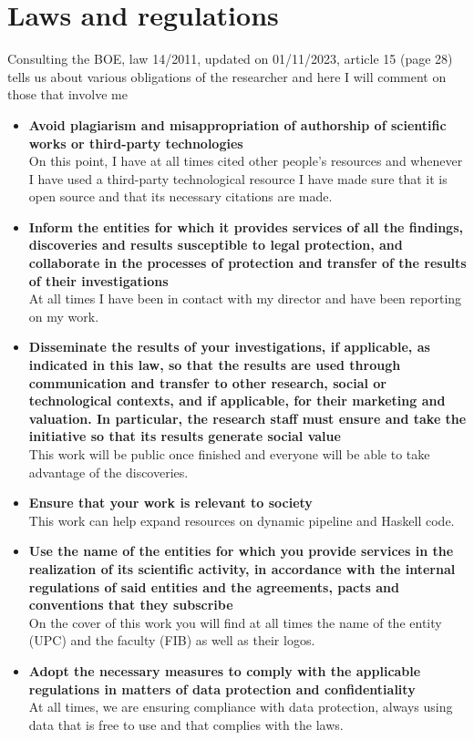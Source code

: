 \chapter{Laws and regulations}
Consulting the BOE, law 14/2011, updated on 01/11/2023, article 15 (page 28) tells us about various obligations of the researcher and here I will comment on those that involve me \cite{}
\begin{itemize}
    \item \textbf{Avoid plagiarism and misappropriation of authorship of scientific works or third-party technologies} \\
    On this point, I have at all times cited other people's resources and whenever I have used a third-party technological resource I have made sure that it is open source and that its necessary citations are made.
    \item \textbf{Inform the entities for which it provides services of all the findings, discoveries and results susceptible to legal protection, and collaborate in the processes of protection and transfer of the results of their investigations} \\
    At all times I have been in contact with my director and have been reporting on my work.
    \item \textbf{Disseminate the results of your investigations, if applicable, as indicated in this law, so that the results are used through communication and transfer to other research, social or technological contexts, and if applicable, for their marketing and valuation. In particular, the research staff must ensure and take the initiative so that its results generate social value} \\
    This work will be public once finished and everyone will be able to take advantage of the discoveries.
    \item \textbf{Ensure that your work is relevant to society} \\
    This work can help expand resources on dynamic pipeline and Haskell code.
    \item \textbf{Use the name of the entities for which you provide services in the realization of its scientific activity, in accordance with the internal regulations of said entities and the agreements, pacts and conventions that they subscribe} \\
    On the cover of this work you will find at all times the name of the entity (UPC) and the faculty (FIB) as well as their logos. 
    \item \textbf{Adopt the necessary measures to comply with the applicable regulations in matters of data protection and confidentiality} \\
    At all times, we are ensuring compliance with data protection, always using data that is free to use and that complies with the laws.
\end{itemize}
